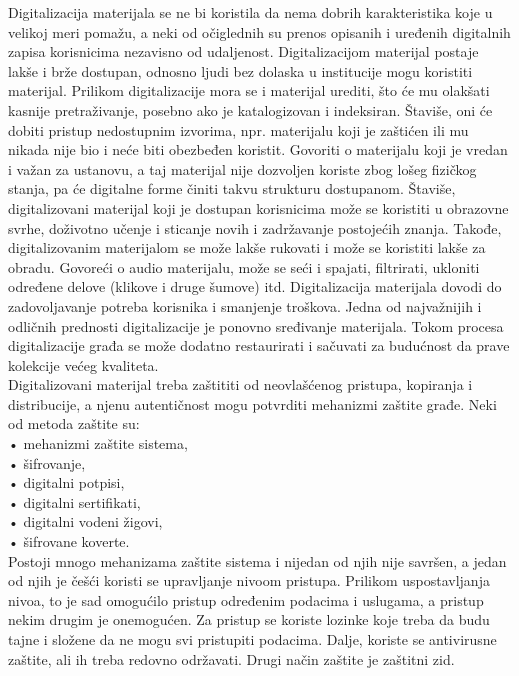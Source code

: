 \documentclass[11pt]{article}
\begin{document}
Digitalizacija materijala se ne bi koristila da nema dobrih karakteristika koje u velikoj meri pomažu,
a neki od očiglednih su prenos opisanih i uređenih digitalnih zapisa korisnicima nezavisno od
udaljenost.
Digitalizacijom materijal postaje lakše i brže dostupan, odnosno ljudi bez dolaska u
institucije mogu koristiti materijal. Prilikom digitalizacije mora se i materijal urediti, što će mu olakšati kasnije pretraživanje, posebno ako je katalogizovan i indeksiran. Štaviše, oni će dobiti
pristup nedostupnim izvorima, npr. materijalu koji je zaštićen ili mu nikada nije bio i neće biti obezbeđen
koristit. Govoriti o materijalu koji je vredan i važan za ustanovu, a taj materijal nije dozvoljen
koriste zbog lošeg fizičkog stanja, pa će digitalne forme činiti takvu strukturu
dostupanom. Štaviše, digitalizovani materijal koji je dostupan korisnicima može se koristiti u
obrazovne svrhe, doživotno učenje i sticanje novih i zadržavanje postojećih znanja. Takođe, digitalizovanim materijalom se može lakše rukovati i može se koristiti lakše za obradu. Govoreći o audio materijalu, može se seći i spajati, filtrirati, ukloniti određene delove (klikove i druge šumove) itd. Digitalizacija materijala dovodi do zadovoljavanje potreba korisnika i smanjenje troškova. Jedna od najvažnijih i odličnih prednosti digitalizacije je ponovno sređivanje materijala. Tokom procesa digitalizacije građa se može dodatno restaurirati i sačuvati za budućnost da prave kolekcije većeg kvaliteta. \\

Digitalizovani materijal treba zaštititi od neovlašćenog pristupa, kopiranja i
distribucije, a njenu autentičnost mogu potvrditi mehanizmi zaštite građe. Neki
od metoda zaštite su: \\
• mehanizmi zaštite sistema, \\
• šifrovanje, \\
• digitalni potpisi, \\
• digitalni sertifikati, \\
• digitalni vodeni žigovi, \\
• šifrovane koverte. \\
Postoji mnogo mehanizama zaštite sistema i nijedan od njih nije savršen, a jedan od njih je češći
koristi se upravljanje nivoom pristupa. Prilikom uspostavljanja nivoa, to je sad omogućilo
pristup određenim podacima i uslugama, a pristup  nekim drugim je onemogućen. Za pristup se koriste lozinke koje treba da budu tajne i složene da ne mogu svi pristupiti podacima. Dalje, koriste se antivirusne zaštite, ali ih treba redovno održavati. Drugi način zaštite je zaštitni zid.
\end{document}
